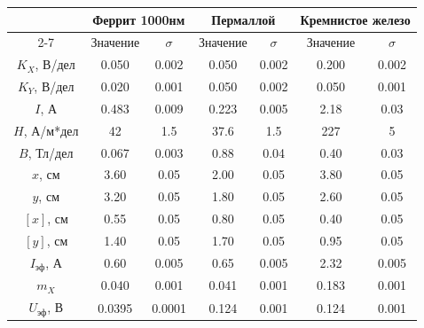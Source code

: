 \documentclass[12pt]{article}
\begin{document}
\begin{enumerate}
\begin{table}[t]
\begin{tabular}{|c|c|c||c|c||c|c|}
\multirow{}{}{} & \multicolumn{2}{c||}{Феррит 1000нм} & \multicolumn{2}{c||}{Пермаллой} & \multicolumn{2}{c|}{Кремнистое железо} \\ \cline{2-7} 
                  & Значение          & $\sigma$          & Значение        & $\sigma$        & Значение            & $\sigma$            \\ \hline
$K_X$, В/дел              & 0.050             & 0.002          & 0.050           & 0.002        & 0.200               & 0.002            \\ \hline
$K_Y$, В/дел              & 0.020             & 0.001          & 0.050           & 0.002        & 0.050               & 0.001            \\ \hline
$I$, А               & 0.483             & 0.009          & 0.223           & 0.005        & 2.18               & 0.03            \\ \hline
$H$, А/м*дел             & 42             & 1.5           & 37.6           & 1.5         & 227                 & 5                \\ \hline
$B$, Тл/дел              & 0.067             & 0.003          & 0.88            & 0.04         & 0.40                & 0.03            \\ \hline
$x$, см                 & 3.60              & 0.05           & 2.00            & 0.05         & 3.80                & 0.05             \\ \hline
$y$, см                 & 3.20              & 0.05           & 1.80            & 0.05         & 2.60                & 0.05             \\ \hline
$[x]$, см              & 0.55              & 0.05              & 0.80              & 0.05              & 0.40              & 0.05              \\ \hline
$[y]$, см              & 1.40              & 0.05              & 1.70              & 0.05              & 0.95              & 0.05              \\ \hline \hline
$I_{\text{эф}}$, А             & 0.60             & 0.005          & 0.65           & 0.005        & 2.32               & 0.005            \\ \hline
$m_X$                & 0.040            & 0.001         & 0.041          & 0.001       & 0.183              & 0.001           \\ \hline
\hline
$U_{\text{эф}}$, В               & 0.0395            & 0.0001         & 0.124          & 0.001       & 0.124              & 0.001           \\ \hline

\end{tabular}
\end{table}
\end{enumerate}
\end{document}
